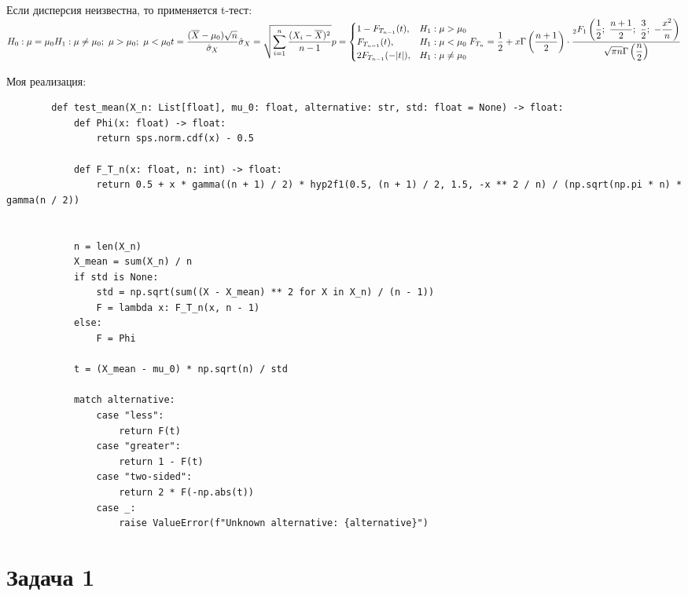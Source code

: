 \documentclass[a4paper,14pt]{extarticle}
\begin{document}
    Если дисперсия неизвестна, то применяется t-тест: \\
    $\displaystyle
    H_0: \mu = \mu_0 \\
    H_1: \mu \neq \mu_0;~ \mu > \mu_0;~ \mu < \mu_0 \\
    t = \frac{(\overline{X} - \mu_0) \sqrt{n}}{\hat{\sigma}_X} \\
    \hat{\sigma}_X = \sqrt{\sum_{i = 1}^n \frac{(X_i - \overline{X})^2}{n - 1}} \\
    p = \begin{cases}
        1 - F_{T_{n - 1}}(t), & H_1: \mu > \mu_0 \\
        F_{T_{n - 1}}(t), & H_1: \mu < \mu_0 \\
        2F_{T_{n - 1}}(-|t|), & H_1: \mu \neq \mu_0
    \end{cases} \\
    F_{T_{n}} = \frac{1}{2} + x\Gamma \left( \frac{n + 1}{2} \right) \cdot \frac{\displaystyle {}_2F_1 \left( \frac{1}{2};~ \frac{n + 1}{2};~ \frac{3}{2} ;~ -\frac{x^2}{n} \right)}{\displaystyle \sqrt{\pi n} \Gamma \left( \frac{n}{2} \right)}
    $

    Моя реализация:
    \begin{verbatim}
        def test_mean(X_n: List[float], mu_0: float, alternative: str, std: float = None) -> float:
            def Phi(x: float) -> float:
                return sps.norm.cdf(x) - 0.5

            def F_T_n(x: float, n: int) -> float:
                return 0.5 + x * gamma((n + 1) / 2) * hyp2f1(0.5, (n + 1) / 2, 1.5, -x ** 2 / n) / (np.sqrt(np.pi * n) * gamma(n / 2))


            n = len(X_n)
            X_mean = sum(X_n) / n
            if std is None:
                std = np.sqrt(sum((X - X_mean) ** 2 for X in X_n) / (n - 1))
                F = lambda x: F_T_n(x, n - 1)
            else:
                F = Phi

            t = (X_mean - mu_0) * np.sqrt(n) / std

            match alternative:
                case "less":
                    return F(t)
                case "greater":
                    return 1 - F(t)
                case "two-sided":
                    return 2 * F(-np.abs(t))
                case _:
                    raise ValueError(f"Unknown alternative: {alternative}")
    \end{verbatim}

    \section{Задача 1}
\end{document}
